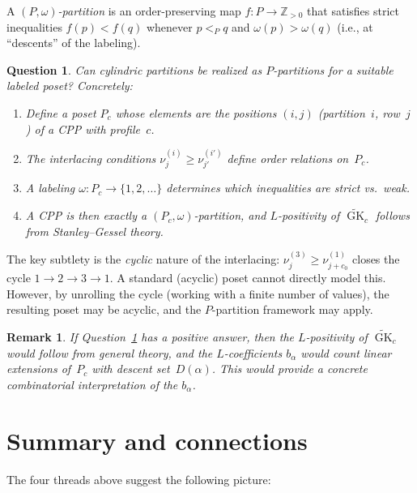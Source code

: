 \documentclass[11pt]{article}
\newtheorem{remark}[theorem]{Remark}
\newtheorem{question}[theorem]{Question}
\newcommand{\Z}{\mathbb{Z}}
\newcommand{\GK}{\operatorname{GK}}
\begin{document}
A \emph{$(P,\omega)$-partition} is an order-preserving map
$f: P \to \Z_{>0}$ that satisfies strict inequalities
$f(p) < f(q)$ whenever $p <_P q$ and $\omega(p) > \omega(q)$
(i.e., at ``descents'' of the labeling).

\begin{question}\label{q:poset}
Can cylindric partitions be realized as $P$-partitions for
a suitable labeled poset? Concretely:
\begin{enumerate}
  \item Define a poset $P_c$ whose elements are the positions
    $(i, j)$ (partition~$i$, row~$j$) of a CPP with profile~$c$.
  \item The interlacing conditions $\nu^{(i)}_j \geq
    \nu^{(i')}_{j'}$ define order relations on~$P_c$.
  \item A labeling $\omega: P_c \to \{1, 2, \ldots\}$ determines
    which inequalities are strict vs.\ weak.
  \item A CPP is then exactly a $(P_c, \omega)$-partition,
    and $L$-positivity of $\widetilde{\GK}_c$ follows from
    Stanley--Gessel theory.
\end{enumerate}
\end{question}

The key subtlety is the \emph{cyclic} nature of the interlacing:
$\nu^{(3)}_j \geq \nu^{(1)}_{j+c_0}$ closes the cycle
$1 \to 2 \to 3 \to 1$. A standard (acyclic) poset cannot directly
model this. However, by unrolling the cycle (working with a
finite number of values), the resulting poset may be acyclic,
and the $P$-partition framework may apply.

\begin{remark}
If Question~\ref{q:poset} has a positive answer, then the
$L$-positivity of $\widetilde{\GK}_c$ would follow from
general theory, and the $L$-coefficients $b_\alpha$ would
count \emph{linear extensions} of~$P_c$ with descent
set~$D(\alpha)$. This would provide a concrete
combinatorial interpretation of the $b_\alpha$.
\end{remark}

\section{Summary and connections}
\label{sec:summary}

The four threads above suggest the following picture:
\end{document}
